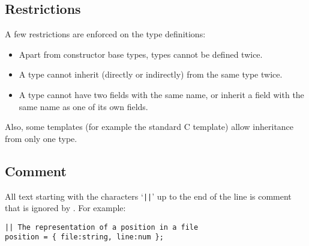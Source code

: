 \subsection{Restrictions}
A few restrictions are enforced on the type definitions:
\begin{itemize}
\item Apart from constructor base types, types cannot be defined twice.
\item A type cannot inherit (directly or indirectly) from the same type
twice.
\item A type cannot have two fields with the same name, or inherit
a field with the same name as one of its own fields.
\end{itemize}
\par
Also, some templates (for example the standard C template) allow inheritance
from only one type.
\subsection{Comment}
All text starting with the characters `\texttt{||}' up to the end of the line
is comment that is ignored by {\Tm}.
For example:
\begin{showfile}
\begin{verbatim}
|| The representation of a position in a file
position = { file:string, line:num };
\end{verbatim}
\end{showfile}
